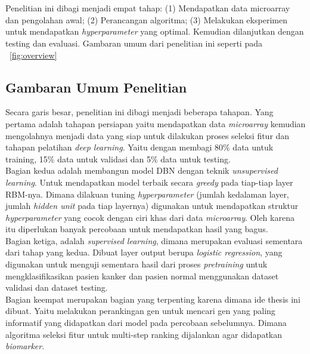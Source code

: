 \chapter{\babTiga}

Penelitian ini dibagi menjadi empat tahap: (1) Mendapatkan data microarray dan pengolahan awal; (2) Perancangan algoritma; (3) Melakukan eksperimen untuk mendapatkan \textit{hyperparameter} yang optimal. Kemudian dilanjutkan dengan  testing dan evaluasi. Gambaran umum dari penelitian ini seperti pada \pic~\ref{fig:overview}




\section{Gambaran Umum Penelitian}

Secara garis besar, penelitian ini dibagi menjadi beberapa tahapan. Yang pertama adalah tahapan persiapan yaitu mendapatkan data \textit{microarray} kemudian mengolahnya menjadi data yang siap untuk dilakukan proses seleksi fitur dan tahapan pelatihan \textit{deep learning}. Yaitu dengan membagi 80\% data untuk training, 15\% data untuk  validasi dan 5\% data untuk testing.\\
Bagian kedua adalah  membangun model DBN dengan teknik \textit{unsupervised learning}. Untuk mendapatkan model terbaik   secara \textit{greedy} pada tiap-tiap layer RBM-nya. Dimana dilakuan tuning \textit{hyperparameter} (jumlah kedalaman layer, jumlah \textit{hidden unit} pada tiap layernya) digunakan untuk mendapatkan struktur \textit{hyperparameter} yang cocok dengan ciri khas dari data \textit{microarray}. Oleh karena itu diperlukan banyak percobaan untuk mendapatkan hasil yang bagus. \\
Bagian ketiga, adalah \textit{supervised learning}, dimana merupakan  evaluasi sementara dari tahap yang kedua. Dibuat layer output berupa \textit{logistic regression}, yang digunakan untuk menguji sementara hasil dari proses \textit{pretraining} untuk mengklasifikasikan pasien kanker dan pasien normal menggunakan dataset validasi dan dataset testing. \\
Bagian keempat merupakan bagian yang terpenting karena  dimana ide thesis ini dibuat. Yaitu melakukan perankingan gen untuk mencari gen yang paling informatif yang didapatkan dari model pada percobaan sebelumnya. Dimana algoritma seleksi fitur untuk multi-step ranking dijalankan agar didapatkan \textit{biomarker}.\\

